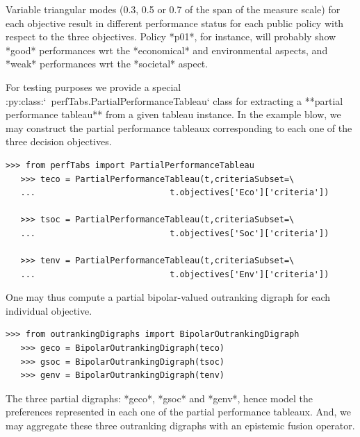 Variable triangular modes (0.3, 0.5 or 0.7 of the span of the measure scale) for each objective result in different performance status for each public policy with respect to the three objectives. Policy *p01*, for instance, will probably show *good* performances wrt the *economical*  and environmental aspects, and *weak* performances wrt the *societal* aspect.

For testing purposes we provide a special :py:class:`~perfTabs.PartialPerformanceTableau` class for extracting a **partial performance tableau** from a given tableau instance. In the example blow, we may construct the partial performance tableaux corresponding to each one of the three decision objectives.

\begin{lstlisting}[basicstyle=\footnotesize]
   >>> from perfTabs import PartialPerformanceTableau
   >>> teco = PartialPerformanceTableau(t,criteriaSubset=\
   ...                           t.objectives['Eco']['criteria'])

   >>> tsoc = PartialPerformanceTableau(t,criteriaSubset=\
   ...                           t.objectives['Soc']['criteria'])

   >>> tenv = PartialPerformanceTableau(t,criteriaSubset=\
   ...                           t.objectives['Env']['criteria'])
 \end{lstlisting}

 One may thus compute a partial bipolar-valued outranking digraph for each individual objective.
 
\begin{lstlisting}[basicstyle=\footnotesize]
   >>> from outrankingDigraphs import BipolarOutrankingDigraph
   >>> geco = BipolarOutrankingDigraph(teco)
   >>> gsoc = BipolarOutrankingDigraph(tsoc)
   >>> genv = BipolarOutrankingDigraph(tenv)
 \end{lstlisting}

 The three partial digraphs: *geco*, *gsoc* and *genv*,  hence model the preferences represented in each one of the partial performance tableaux. And, we may aggregate these three outranking digraphs with an epistemic fusion operator.

